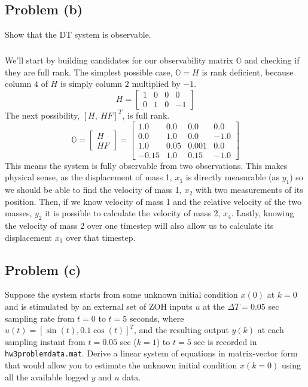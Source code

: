 \documentclass[11pt]{article}
\begin{document}
\subsection*{Problem (b)}
Show that the DT system is observable.

\subparagraph*{}
We'll start by building candidates for our observability matrix $\mathbb{O}$ and checking if they are full rank. The simplest possible case, $\mathbb{O} = H$ is rank deficient, because column $4$ of $H$ is simply column $2$ multiplied by $-1$.
\begin{equation*}
	H = \begin{bmatrix} 1 & 0 & 0 & 0 \\ 0 & 1 & 0 & -1 \end{bmatrix}
\end{equation*}
The next possibility, $[H,\ HF]^T$, is full rank. 
\begin{equation*}
	\mathbb{O} = \begin{bmatrix} H \\ HF \end{bmatrix} = \begin{bmatrix} 1.0 & 0.0 & 0.0 & 0.0 \\ 0.0 & 1.0 & 0.0 & -1.0 \\ 1.0 & 0.05 & 0.001 & 0.0 \\ -0.15 & 1.0 & 0.15 & -1.0 \end{bmatrix}
\end{equation*}
This means the system is fully observable from two observations. This makes physical sense, as the displacement of mass 1, $x_1$ is directly measurable (as $y_1$) so we should be able to find the velocity of mass 1, $x_2$ with two measurements of its position. Then, if we know velocity of mass 1 and the relative velocity of the two masses, $y_2$ it is possible to calculate the velocity of mass 2, $x_4$. Lastly, knowing the velocity of mass 2 over one timestep will also allow us to calculate its displacement $x_3$ over that timestep.

\subsection*{Problem (c)}
Suppose the system starts from some unknown initial condition $x(0)$ at $k=0$ and is stimulated by an external set of ZOH inputs $u$ at the $\Delta T = 0.05$ sec sampling rate from $t=0$ to $t=5$ seconds, where $u(t)=[\sin(t), 0.1\cos(t)]^T$, and the resulting output $y(k)$ at each sampling instant from $t=0.05$ sec ($k=1$) to $t=5$ sec is recorded in \texttt{hw3problemdata.mat}. Derive a linear system of equations in matrix-vector form that would allow you to estimate the unknown initial condition $x(k=0)$ using all the available logged $y$ and $u$ data.
\end{document}
